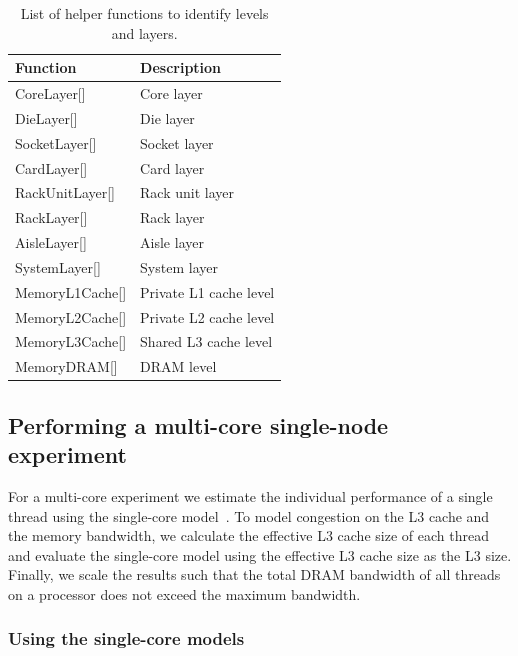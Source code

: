 \begin{table}
 \centering
 \small
 \caption{List of helper functions to identify levels and layers.}
 \label{tbl:300:levels}
 \begin{tabular}{ll}
   \toprule
   \textbf{Function} & \textbf{Description} \\
   \midrule
   CoreLayer[] & Core layer \\
   DieLayer[] & Die layer \\
   SocketLayer[] & Socket layer \\
   CardLayer[] & Card layer \\
   RackUnitLayer[] & Rack unit layer \\
   RackLayer[] & Rack layer \\
   AisleLayer[] & Aisle layer \\
   SystemLayer[] & System layer \\
   \midrule
   MemoryL1Cache[] & Private L1 cache level \\
   MemoryL2Cache[] & Private L2 cache level \\
   MemoryL3Cache[] & Shared L3 cache level \\
   MemoryDRAM[] & DRAM level \\
   \bottomrule
  \end{tabular}
\end{table} 

\subsection{Performing a multi-core single-node experiment}

For a multi-core experiment we estimate the individual performance of a single thread using the single-core model~\cite{Jongerius2016}. To model congestion on the L3 cache and the memory bandwidth, we calculate the effective L3 cache size of each thread and evaluate the single-core model using the effective L3 cache size as the L3 size. Finally, we scale the results such that the total DRAM bandwidth of all threads on a processor does not exceed the maximum bandwidth.

\subsubsection{Using the single-core models}

